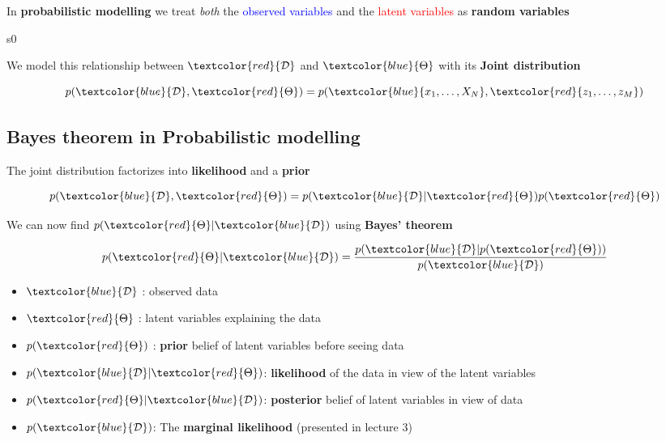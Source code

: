 \begin{wbox}{}
    In \textbf{probabilistic modelling} we treat \emph{both} the \textcolor{blue}{observed variables} and the \textcolor{red}{latent variables} as \textbf{random variables} 
\end{wbox}
s0

We model this relationship between $\textcolor{red}{\mathcal{D}}$ and $\textcolor{blue}{\Theta}$ with its \textbf{Joint distribution}

\begin{equation}
    p(\textcolor{blue}{\mathcal{D}}, \textcolor{red}{\Theta}) = p(\textcolor{blue}{x_1, \dots, X_N},\textcolor{red}{z_1, \dots, z_M})
\end{equation}


\subsection{Bayes theorem in Probabilistic modelling}
The joint distribution factorizes into \textbf{likelihood} and a \textbf{prior}

\begin{equation}
    p(\textcolor{blue}{\mathcal{D}}, \textcolor{red}{\Theta}) = p(\textcolor{blue}{\mathcal{D}}|\textcolor{red}{\Theta})p(\textcolor{red}{\Theta}) 
\end{equation}

We can now find $p(\textcolor{red}{\Theta} | \textcolor{blue}{\mathcal{D}})$ using \textbf{Bayes' theorem}

\begin{equation}
    p(\textcolor{red}{\Theta} | \textcolor{blue}{\mathcal{D}}) = \frac{p(\textcolor{blue}{\mathcal{D}}|p(\textcolor{red}{\Theta}))} {p(\textcolor{blue}{\mathcal{D}})} 
\end{equation}


\begin{definition}{}
\begin{itemize}
    \item $\textcolor{blue}{\mathcal{D}}$ : observed data
    \item $\textcolor{red}{\Theta}$ : latent variables explaining the data
    \item $p(\textcolor{red}{\Theta})$ : \textbf{prior} belief of latent variables before seeing data
    \item $p(\textcolor{blue}{\mathcal{D}}|\textcolor{red}{\Theta})$: \textbf{likelihood} of the data in view of the latent variables
    \item $p(\textcolor{red}{\Theta}|\textcolor{blue}{\mathcal{D}})$: \textbf{posterior} belief of latent variables in view of data 
    \item $p(\textcolor{blue}{\mathcal{D}})$: The \textbf{marginal likelihood} (presented in lecture 3)
\end{itemize}
\end{definition}


